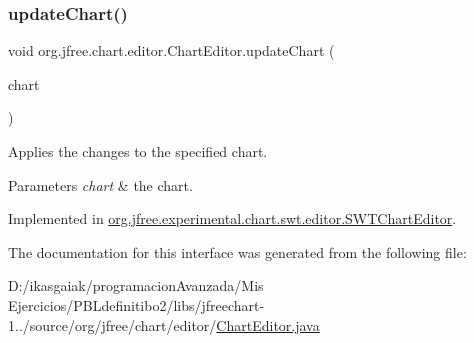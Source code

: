 \subsubsection{\texorpdfstring{update\+Chart()}{updateChart()}}
{\footnotesize\ttfamily void org.\+jfree.\+chart.\+editor.\+Chart\+Editor.\+update\+Chart (\begin{DoxyParamCaption}\item[{\mbox{\hyperlink{classorg_1_1jfree_1_1chart_1_1_j_free_chart}{J\+Free\+Chart}}}]{chart }\end{DoxyParamCaption})}

Applies the changes to the specified chart.


\begin{DoxyParams}{Parameters}
{\em chart} & the chart. \\
\hline
\end{DoxyParams}


Implemented in \mbox{\hyperlink{classorg_1_1jfree_1_1experimental_1_1chart_1_1swt_1_1editor_1_1_s_w_t_chart_editor_a5efd014f93a0bfbe30f4f5110a2844b8}{org.\+jfree.\+experimental.\+chart.\+swt.\+editor.\+S\+W\+T\+Chart\+Editor}}.



The documentation for this interface was generated from the following file\+:\begin{DoxyCompactItemize}
\item 
D\+:/ikasgaiak/programacion\+Avanzada/\+Mis Ejercicios/\+P\+B\+Ldefinitibo2/libs/jfreechart-\/1../source/org/jfree/chart/editor/\mbox{\hyperlink{_chart_editor_8java}{Chart\+Editor.\+java}}\end{DoxyCompactItemize}
